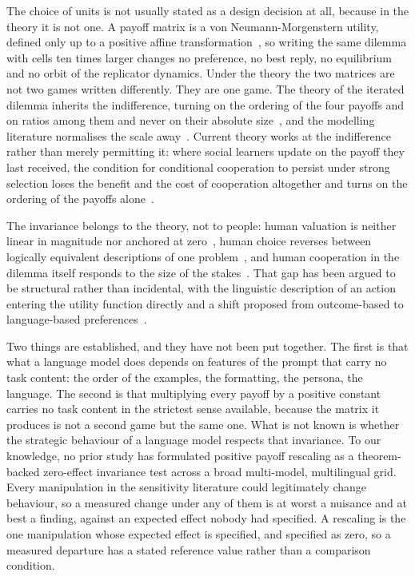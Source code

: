 \documentclass[11pt,a4paper]{article}
\begin{document}
The choice of units is not usually stated as a design decision at all, because
in the theory it is not one. A payoff matrix is a von Neumann-Morgenstern
utility, defined only up to a positive affine
transformation~\cite{von2007theory,luce1957games}, so writing the same dilemma
with cells ten times larger changes no preference, no best reply, no
equilibrium and no orbit of the replicator dynamics. Under the theory the two
matrices are not two games written differently. They are one game. The theory
of the iterated dilemma inherits the indifference, turning on the ordering of
the four payoffs and on ratios among them and never on their absolute
size~\cite{axelrod1981evolution,nowak1992tit,nowak1993strategy,pressDyson2012},
and the modelling literature normalises the scale
away~\cite{szabo2007evolutionary,perc2010coevolutionary,wang2015universal}.
Current theory works at the indifference rather than merely permitting it:
where social learners update on the payoff they last received, the condition
for conditional cooperation to persist under strong selection loses the benefit
and the cost of cooperation altogether and turns on the ordering of the payoffs
alone~\cite{glynatsi2024evolution}.

The invariance belongs to the theory, not to people: human valuation is neither
linear in magnitude nor anchored at zero~\cite{kahneman1979prospect}, human
choice reverses between logically equivalent descriptions of one
problem~\cite{tversky1981framing}, and human cooperation in the dilemma itself
responds to the size of the stakes~\cite{krockow2016cooperation,list2006friend}.
That gap has been argued to be structural rather than incidental, with the
linguistic description of an action entering the utility function directly and
a shift proposed from outcome-based to language-based
preferences~\cite{capraro2024language}.

Two things are established, and they have not been put together. The first is
that what a language model does depends on features of the prompt that carry no
task content: the order of the examples, the formatting, the persona, the
language. The second is that multiplying every payoff by a positive constant
carries no task content in the strictest sense available, because the matrix it
produces is not a second game but the same one. What is not known is whether
the strategic behaviour of a language model respects that invariance. To our
knowledge, no prior study has formulated positive payoff rescaling as a
theorem-backed zero-effect invariance test across a broad multi-model,
multilingual grid. Every manipulation in the sensitivity literature
could legitimately change behaviour, so a measured change under any of them is
at worst a nuisance and at best a finding, against an expected effect nobody
had specified. A rescaling is the one manipulation whose expected effect is
specified, and specified as zero, so a measured departure has a stated
reference value rather than a comparison condition.
\end{document}
